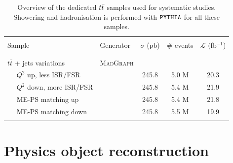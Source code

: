 \begin{table}[htbp]
  \begin{center}
  \caption{Overview of the dedicated $t\bar{t}$ samples used for systematic studies. Showering and hadronisation is performed with $\texttt{PYTHIA}$ for all these samples.} \label{table::SamplesSyst}
    \begin{tabular}{|l|l|c|c|c|}
      \hline
       & & & & \\
      Sample & Generator & $\sigma$ (pb) & \# events & $\mathcal{L}$ (fb$^{-1}$) \\
       & & & & \\ 
       \hline
       & & & & \\
      $t\bar{t}$ + jets variations & \textsc{MadGraph} & & & \\
       ~~ $Q^2$ up, less ISR/FSR & & 245.8 & 5.0 M & 20.3 \\
      ~~ $Q^2$ down, more ISR/FSR & & 245.8 & 5.4 M & 21.9 \\
      ~~ ME-PS matching up & & 245.8 & 5.4 M & 21.8 \\
      ~~ ME-PS matching down & & 245.8 & 5.5 M & 19.9 \\
       & & & & \\
      \hline
   \end{tabular}
 \end{center}
\end{table}

\section{Physics object reconstruction} \label{sec::PhysicsObjects}

